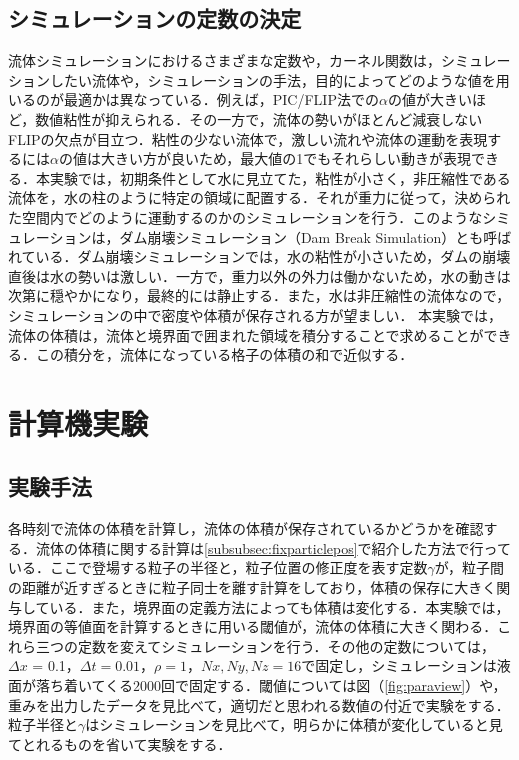 \documentclass[a4j,12pt]{jreport}
\begin{document}
\section{シミュレーションの定数の決定} \label{sec:constant}
流体シミュレーションにおけるさまざまな定数や，カーネル関数は，シミュレーションしたい流体や，シミュレーションの手法，目的によってどのような値を用いるのが最適かは異なっている．例えば，PIC/FLIP法での$\alpha$の値が大きいほど，数値粘性が抑えられる．その一方で，流体の勢いがほとんど減衰しないFLIPの欠点が目立つ．粘性の少ない流体で，激しい流れや流体の運動を表現するには$\alpha$の値は大きい方が良いため，最大値の1でもそれらしい動きが表現できる．本実験では，初期条件として水に見立てた，粘性が小さく，非圧縮性である流体を，水の柱のように特定の領域に配置する．それが重力に従って，決められた空間内でどのように運動するのかのシミュレーションを行う．このようなシミュレーションは，ダム崩壊シミュレーション（Dam Break Simulation）とも呼ばれている．ダム崩壊シミュレーションでは，水の粘性が小さいため，ダムの崩壊直後は水の勢いは激しい．一方で，重力以外の外力は働かないため，水の動きは次第に穏やかになり，最終的には静止する．また，水は非圧縮性の流体なので，シミュレーションの中で密度や体積が保存される方が望ましい．
本実験では，流体の体積は，流体と境界面で囲まれた領域を積分することで求めることができる．この積分を，流体になっている格子の体積の和で近似する．

\chapter{計算機実験} \label{chapter:5}
\section{実験手法} \label{sec:exp_method}
各時刻で流体の体積を計算し，流体の体積が保存されているかどうかを確認する．流体の体積に関する計算は\ref{subsubsec:fixparticlepos}で紹介した方法で行っている．ここで登場する粒子の半径と，粒子位置の修正度を表す定数$\gamma$が，粒子間の距離が近すぎるときに粒子同士を離す計算をしており，体積の保存に大きく関与している．また，境界面の定義方法によっても体積は変化する．本実験では，境界面の等値面を計算するときに用いる閾値が，流体の体積に大きく関わる．これら三つの定数を変えてシミュレーションを行う．その他の定数については，$\varDelta x$ = 0.1，$\varDelta t = 0.01$，$\rho = 1$，$Nx,Ny,Nz = 16$で固定し，シミュレーションは液面が落ち着いてくる$2000回$で固定する．閾値については図（\ref{fig:paraview}）や，重みを出力したデータを見比べて，適切だと思われる数値の付近で実験をする．粒子半径と$\gamma$はシミュレーションを見比べて，明らかに体積が変化していると見てとれるものを省いて実験をする．
\end{document}
